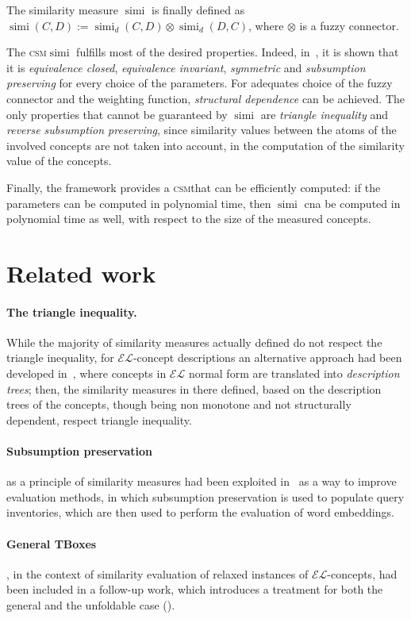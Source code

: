 \documentclass[]{llncs}
\DeclareMathOperator{\simi}{simi}
\newcommand{\el}{\(\mathcal{EL}{}\)}
\newcommand{\csm}{\textsc{csm}}
\begin{document}
  The similarity measure \(\simi\) is finally defined as \(\simi(C,D) := \simi_d(C,D) \otimes \simi_d(D,C)\), where \(\otimes{}\) is a fuzzy connector.

  The \csm \(\simi\) fulfills most of the desired properties.
  Indeed, in~\cite{LeTu12}, it is shown that it is \emph{equivalence closed}, \emph{equivalence invariant}, \emph{symmetric} and \emph{subsumption preserving} for every choice of the parameters.
  For adequates choice of the fuzzy connector and the weighting function, \emph{structural dependence} can be achieved.
  The only properties that cannot be guaranteed by \(\simi\) are \emph{triangle inequality} and \emph{reverse subsumption preserving}, since similarity values between the atoms of the involved concepts are not taken into account, in the computation of the similarity value of the concepts.

  Finally, the framework provides a \csm that can be efficiently computed: if the parameters can be computed in polynomial time, then \(\simi\) cna be computed in polynomial time as well, with respect to the size of the measured concepts.

  \section{Related work}

  \paragraph{The triangle inequality.} While the majority of similarity measures actually defined do not respect the triangle inequality, for \el-concept descriptions an alternative approach had been developed in~\cite{DAB14}, where concepts in \el{} normal form are translated into \emph{description trees}; then, the similarity measures in there defined, based on the description trees of the concepts, though being non monotone and not structurally dependent, respect triangle inequality.

  \paragraph{Subsumption preservation} as a principle of similarity measures had been exploited in~\cite{Se16} as a way to improve evaluation methods, in which subsumption preservation is used to populate query inventories, which are then used to perform the evaluation of word embeddings.

  \paragraph{General TBoxes}, in the context of similarity evaluation of relaxed instances of \el-concepts, had been included in a follow-up work, which introduces a treatment for both the general and the unfoldable case (\cite{Ec14}).
\end{document}
